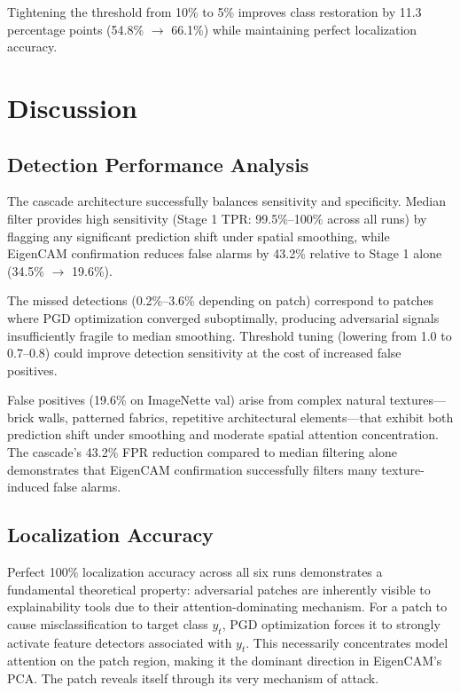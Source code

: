 \documentclass[conference]{IEEEtran}
\begin{document}
Tightening the threshold from 10\% to 5\% improves class restoration by 11.3 percentage points (54.8\% $\rightarrow$ 66.1\%) while maintaining perfect localization accuracy.

\section{Discussion}

\subsection{Detection Performance Analysis}

The cascade architecture successfully balances sensitivity and specificity. Median filter provides high sensitivity (Stage 1 TPR: 99.5\%--100\% across all runs) by flagging any significant prediction shift under spatial smoothing, while EigenCAM confirmation reduces false alarms by 43.2\% relative to Stage 1 alone (34.5\% $\rightarrow$ 19.6\%).

The missed detections (0.2\%--3.6\% depending on patch) correspond to patches where PGD optimization converged suboptimally, producing adversarial signals insufficiently fragile to median smoothing. Threshold tuning (lowering from 1.0 to 0.7--0.8) could improve detection sensitivity at the cost of increased false positives.

False positives (19.6\% on ImageNette val) arise from complex natural textures---brick walls, patterned fabrics, repetitive architectural elements---that exhibit both prediction shift under smoothing and moderate spatial attention concentration. The cascade's 43.2\% FPR reduction compared to median filtering alone demonstrates that EigenCAM confirmation successfully filters many texture-induced false alarms.

\subsection{Localization Accuracy}

Perfect 100\% localization accuracy across all six runs demonstrates a fundamental theoretical property: adversarial patches are inherently visible to explainability tools due to their attention-dominating mechanism. For a patch to cause misclassification to target class $y_t$, PGD optimization forces it to strongly activate feature detectors associated with $y_t$. This necessarily concentrates model attention on the patch region, making it the dominant direction in EigenCAM's PCA. The patch reveals itself through its very mechanism of attack.
\end{document}
